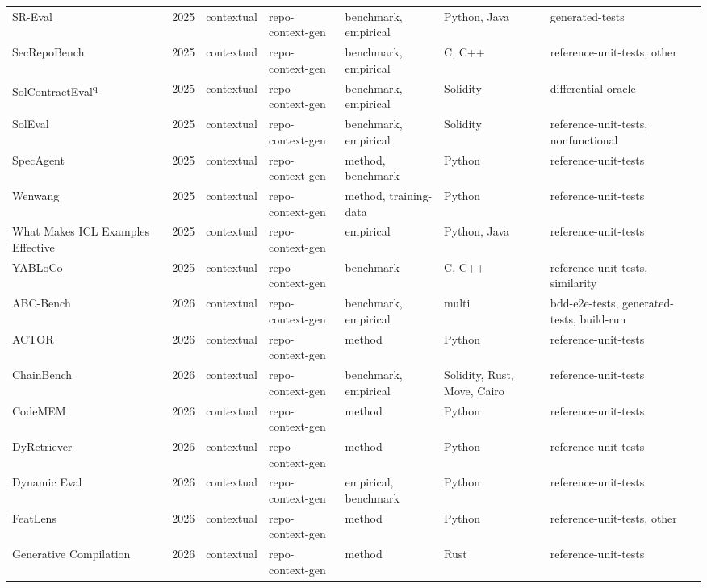 {\begin{longtable}{@{}p{2.8cm}lllp{1.9cm}p{1.5cm}p{2.9cm}@{}}
SR-Eval~\cite{SREval2025} & 2025 & contextual & repo-context-gen & benchmark, empirical & Python, Java & generated-tests \\
SecRepoBench~\cite{SecRepoBench2025} & 2025 & contextual & repo-context-gen & benchmark, empirical & C, C++ & reference-unit-tests, other \\
SolContractEval\textsuperscript{q}~\cite{SolContractEval2025} & 2025 & contextual & repo-context-gen & benchmark, empirical & Solidity & differential-oracle \\
SolEval~\cite{SolEval2025} & 2025 & contextual & repo-context-gen & benchmark, empirical & Solidity & reference-unit-tests, nonfunctional \\
SpecAgent~\cite{SpecAgent2025} & 2025 & contextual & repo-context-gen & method, benchmark & Python & reference-unit-tests \\
Wenwang~\cite{Wenwang2025} & 2025 & contextual & repo-context-gen & method, training-data & Python & reference-unit-tests \\
What Makes ICL Examples Effective~\cite{WhatMakesICLExamplesEffe2025} & 2025 & contextual & repo-context-gen & empirical & Python, Java & reference-unit-tests \\
YABLoCo~\cite{YABLoCo2025} & 2025 & contextual & repo-context-gen & benchmark & C, C++ & reference-unit-tests, similarity \\
ABC-Bench~\cite{ABCBench2026} & 2026 & contextual & repo-context-gen & benchmark, empirical & multi & bdd-e2e-tests, generated-tests, build-run \\
ACTOR~\cite{ACTOR2026} & 2026 & contextual & repo-context-gen & method & Python & reference-unit-tests \\
ChainBench~\cite{ChainBench2026} & 2026 & contextual & repo-context-gen & benchmark, empirical & Solidity, Rust, Move, Cairo & reference-unit-tests \\
CodeMEM~\cite{CodeMEM2026} & 2026 & contextual & repo-context-gen & method & Python & reference-unit-tests \\
DyRetriever~\cite{DyRetriever2026} & 2026 & contextual & repo-context-gen & method & Python & reference-unit-tests \\
Dynamic Eval~\cite{DynamicEval2026} & 2026 & contextual & repo-context-gen & empirical, benchmark & Python & reference-unit-tests \\
FeatLens~\cite{FeatLens2026} & 2026 & contextual & repo-context-gen & method & Python & reference-unit-tests, other \\
Generative Compilation~\cite{GenerativeCompilation2026} & 2026 & contextual & repo-context-gen & method & Rust & reference-unit-tests \\

\end{longtable}}
